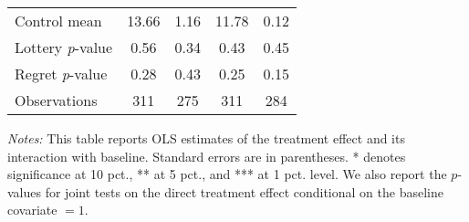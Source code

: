 \begin{table}[htbp]
{\begin{threeparttable}
\begin{tabular}{l*{4}{c}}
Control mean    &    13.66         &     1.16         &    11.78         &     0.12         \\
Lottery \emph{p}-value&     0.56         &     0.34         &     0.43         &     0.45         \\
Regret \emph{p}-value&     0.28         &     0.43         &     0.25         &     0.15         \\
Observations    &      311         &      275         &      311         &      284         \\
\bottomrule \end{tabular} \begin{tablenotes}[flushleft] \footnotesize \item \emph{Notes:} This table reports OLS estimates of the treatment effect and its interaction with baseline. Standard errors are in parentheses. * denotes significance at 10 pct., ** at 5 pct., and *** at 1 pct. level. We also report the \(p\)-values for joint tests on the direct treatment effect conditional on the baseline covariate $= 1$. \end{tablenotes} \end{threeparttable} } \end{table}
